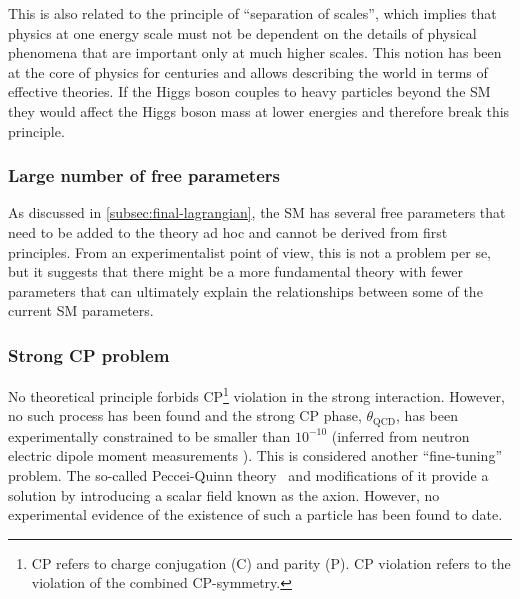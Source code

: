 This is also related to the principle of ``separation of scales'', which implies that physics at one energy scale must not be dependent on the details of physical phenomena that are important only at much higher scales.
This notion has been at the core of physics for centuries and allows describing the world in terms of effective theories. 
If the Higgs boson couples to heavy particles beyond the SM they would affect the Higgs boson mass at lower energies and therefore break this principle.

\subsubsection{Large number of free parameters}
As discussed in \cref{subsec:final-lagrangian}, the SM has several free parameters that need to be added to the theory ad hoc and cannot be derived from first principles. 
From an experimentalist point of view, this is not a problem per se, but it suggests that there might be a more fundamental theory with fewer parameters that can ultimately explain the relationships between some of the current SM parameters.


\subsubsection{Strong CP problem}
No theoretical principle forbids CP\footnote{CP refers to charge conjugation (C) and parity (P). CP violation refers to the violation of the combined CP-symmetry.} violation in the strong interaction. However, no such process has been found and the strong CP phase, $\theta_{\text{QCD}}$, has been experimentally constrained to be smaller than $10^{-10}$ (inferred from neutron electric dipole moment measurements \cite{Baker_2006}). This is considered another ``fine-tuning'' problem.
The so-called Peccei-Quinn theory~\cite{PhysRevLett.38.1440} and modifications of it provide a solution by introducing a scalar field known as the axion. However, no experimental evidence of the existence of such a particle has been found to date.

